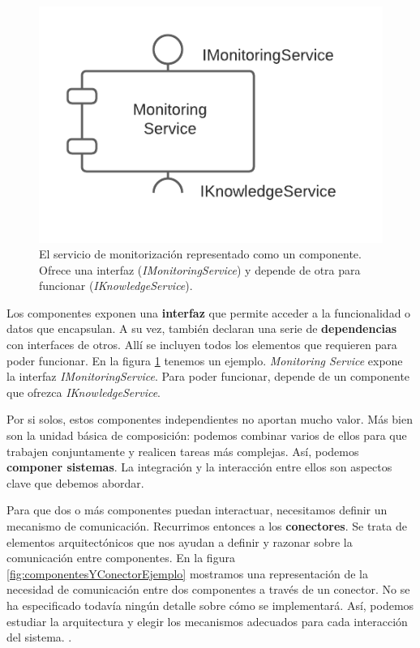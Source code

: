 \begin{figure}
  \centering
  \includegraphics[scale=0.8]{cap_arquitectura/images/componente-ejemplo}
  \caption{El servicio de monitorización representado como un componente. Ofrece una interfaz (\emph{IMonitoringService}) y depende de otra para funcionar (\emph{IKnowledgeService}).}
  \label{fig:componenteEjemplo}
\end{figure}

Los componentes exponen una \textbf{interfaz} que permite acceder a la funcionalidad o datos que encapsulan. A su vez, también declaran una serie de \textbf{dependencias} con interfaces de otros. Allí se incluyen todos los elementos que requieren para poder funcionar. En la figura \ref{fig:componenteEjemplo} tenemos un ejemplo. \emph{Monitoring Service} expone la interfaz \emph{IMonitoringService}. Para poder funcionar, depende de un componente que ofrezca \emph{IKnowledgeService}.

Por si solos, estos componentes independientes no aportan mucho valor. Más bien son la unidad básica de composición: podemos combinar varios de ellos para que trabajen conjuntamente y realicen tareas más complejas. Así, podemos \textbf{componer sistemas}. \cite{mehtaTaxonomySoftwareConnectors2000} La integración y la interacción entre ellos son aspectos clave que debemos abordar.

Para que dos o más componentes puedan interactuar, necesitamos definir un mecanismo de comunicación. Recurrimos entonces a los \textbf{conectores}. Se trata de elementos arquitectónicos que nos ayudan a definir y razonar sobre la comunicación entre componentes. En la figura \ref{fig:componentesYConectorEjemplo} mostramos una representación de la necesidad de comunicación entre dos componentes a través de un conector. No se ha especificado todavía ningún detalle sobre cómo se implementará. Así, podemos estudiar la arquitectura y elegir los mecanismos adecuados para cada interacción del sistema. \cite{taylorSoftwareArchitectureFoundations2009}.

